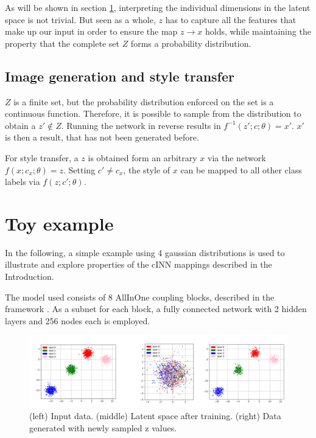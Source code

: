 \documentclass[final]{cvpr}
\begin{document}
As will be shown in section \ref{toy}, interpreting the individual dimensions in the latent space is not trivial. But seen as a whole, $z$ has to capture all the features that make up our input in order to ensure the map $z \rightarrow x $ holds, while maintaining the property that the complete set $Z$ forms a probability distribution. 

\subsection{Image generation and style transfer}
$Z$ is a finite set, but the probability distribution enforced on the set is a continuous function. Therefore, it is possible to sample from the distribution to obtain a $z' \notin Z$. Running the network in reverse results in $f^{-1}(z';c;\theta) = x'$. $x'$ is then a result, that has not been generated before. 

For style transfer, a $z$ is obtained form an arbitrary $x$ via the network $f(x;c_x;\theta) = z$. Setting $c' \neq c_x$, the style of $x$ can be mapped to all other class labels via $f(z;c';\theta)$.

\section{Toy example}\label{toy}
In the following, a simple example using 4 gaussian distributions is used to illustrate and explore properties of the cINN mappings described in the Introduction.

The model used consists of 8 AllInOne coupling blocks, described in the framework \cite{freia}. As a subnet for each block, a fully connected network with 2 hidden layers and 256 nodes each is employed.

\begin{figure}[t]
	\begin{center}
		\includegraphics[width=1.0\linewidth]{./figs/toy/no_style/combined.png}
	\end{center}
	\caption{(left) Input data. (middle) Latent space after training. (right) Data generated with newly sampled z values.}
	\label{fig:toy_generation}
\end{figure}
\end{document}
